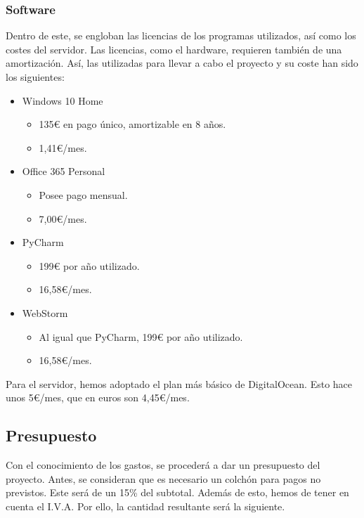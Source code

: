 \subsubsection{Software}
Dentro de este, se engloban las licencias de los programas utilizados, así como los costes del servidor.
Las licencias, como el hardware, requieren también de una amortización. Así, las utilizadas para llevar a cabo el proyecto y su coste han sido los siguientes:
\begin{itemize}
    \item Windows 10 Home
    \begin{itemize}
        \item 135€ en pago único, amortizable en 8 años.
        \item 1,41€/mes.
    \end{itemize}
    \item Office 365 Personal
    \begin{itemize}
        \item Posee pago mensual.
        \item 7,00€/mes.
    \end{itemize}
    \item PyCharm
    \begin{itemize}
        \item 199€ por año utilizado.
        \item 16,58€/mes.
    \end{itemize}
    \item WebStorm
    \begin{itemize}
        \item Al igual que PyCharm, 199€ por año utilizado.
        \item 16,58€/mes.
    \end{itemize}
\end{itemize}

Para el servidor, hemos adoptado el plan más básico de DigitalOcean. Esto hace unos 5€/mes, que en euros son 4,45€/mes.

\subsection{Presupuesto}
Con el conocimiento de los gastos, se procederá a dar un presupuesto del proyecto. Antes, se consideran que es necesario un colchón para pagos no previstos. Este será de un 15\% del subtotal. Además de esto, hemos de tener en cuenta el I.V.A. Por ello, la cantidad resultante será la siguiente.

